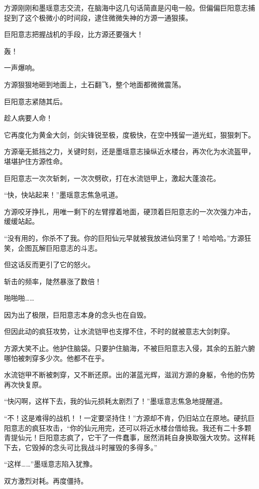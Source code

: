 
\begin{this_body}

方源刚刚和墨瑶意志交流，在脑海中这几句话简直是闪电一般。但偏偏巨阳意志捕捉到了这个极微小的时间段，逮住微微失神的方源一通狠揍。

巨阳意志把握战机的手段，比方源还要强大！

轰！

一声爆响。

方源狠狠地砸到地面上，土石翻飞，整个地面都微微震荡。

巨阳意志紧随其后。

趁人病要人命！

它再度化为黄金大剑，剑尖锋锐至极，度极快，在空中残留一道光虹，狠狠刺下。

方源毫无抵挡之力，关键时刻，还是墨瑶意志操纵近水楼台，再次化为水流盔甲，堪堪护住方源性命。

巨阳意志一次次斩刺，一次次劈砍，打在水流铠甲上，激起大蓬浪花。

“快，快站起来！”墨瑶意志焦急吼道。

方源咬牙挣扎，用唯一剩下的左臂撑着地面，硬顶着巨阳意志的一次次强力冲击，缓缓站起。

“没有用的，你杀不了我。你的巨阳仙元早就被我放进仙窍里了！哈哈哈。”方源狂笑，企图瓦解巨阳意志的斗志。

但这话反而更引了它的怒火。

斩击的频率，陡然暴涨了数倍！

啪啪啪……

因为出了极限，巨阳意志本身的念头也在自毁。

但因此动的疯狂攻势，让水流铠甲也支撑不住，不时的就被意志大剑刺穿。

方源大笑不止。他护住脑袋。只要护住脑海，不被巨阳意志入侵，其余的五脏六腑哪怕被刺穿多少次。他都不在乎。

水流铠甲不断被刺穿，又不断还原。出的湛蓝光辉，滋润方源的身躯，令他的伤势再次快复原。

“快闪啊，这样下去，我的仙元损耗太剧烈了！”墨瑶意志焦急地提醒道。

“不！这是难得的战机！！一定要坚持住！”方源却不肯，仍旧站立在原地。硬抗巨阳意志的疯狂攻击，“你的仙元用完，还可以将近水楼台借给我。我还有二十多颗青提仙元！巨阳意志疯了，它干了一件蠢事，居然消耗自身换取强大攻势。这样耗下去，它毁掉的念头可比我战斗时摧毁的多得多。”

“这样……”墨瑶意志陷入犹豫。

双方激烈对耗。再度僵持。


\end{this_body}
